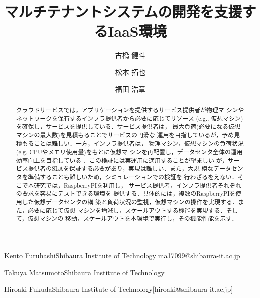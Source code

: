 \documentclass[submit,techrep]{ipsj}
\begin{document}
\title{マルチテナントシステムの開発を支援するIaaS環境}


\author{古橋 健斗}{Kento Furuhashi}{Shibaura Institute of Technology}[ma17099@shibaura-it.ac.jp]
\author{松本 拓也}{Takuya Matsumoto}{Shibaura Institute of Technology}
\author{福田 浩章}{Hiroaki Fukuda}{Shibaura Institute of Technology}[hiroaki@shibaura-it.ac.jp]

\begin{abstract}
クラウドサービスでは，アプリケーションを提供するサービス提供者が物理マ
シンやネットワークを保有するインフラ提供者から必要に応じてリソース
(e.g., 仮想マシン)を確保し，サービスを提供している．サービス提供者は，
最大負荷(必要になる仮想マシンの最大数)を見積もることでサービスの円滑な
運用を目指しているが，予め見積もることは難しい．一方，インフラ提供者は，
物理マシン，仮想マシンの負荷状況(e.g, CPUやメモリ使用量)をもとに仮想マ
シンを再配置し，データセンタ全体の運用効率向上を目指している
\cite{cloud1}\cite{cloud2}．この検証には実運用に適用することが望ましい
が，サービス提供者のSLAを保証する必要があり，実現は難しい．また，大規
模なデータセンタを準備することも難しいため，シミュレーションでの検証を
行わざるをえない\cite{testbed}．そこで本研究では，RaspberryPIを利用し，
サービス提供者，インフラ提供者それぞれの要求を容易にテストできる環境を
提供する．具体的には，複数のRaspberryPIを使用した仮想データセンタの構
築と負荷状況の監視，仮想マシンの操作を実現する．また，必要に応じて仮想
マシンを増減し，スケールアウトする機能を実現する．そして，仮想マシンの
移動，スケールアウトを本環境で実行し，その機能性能を示す．
\end{abstract}

%
%
%
\end{document}
